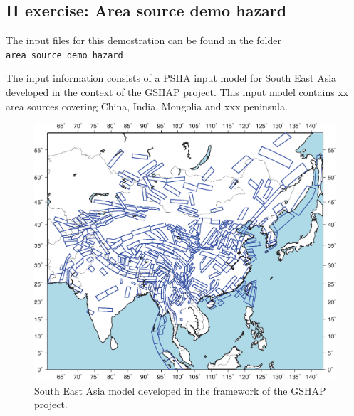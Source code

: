 \subsection{II exercise: Area source demo hazard}
%
The input files for this demostration can be found in the folder 
\texttt{area\_\-source\_\-demo\_\-hazard}

The input information consists of a PSHA input model for South East Asia 
developed in the context of the GSHAP project. This input model contains 
xx area sources covering China, India, Mongolia and xxx peninsula.

\begin{figure}[!ht]
\centering
\includegraphics[width=\textwidth,angle=0]{./figures/seAsiaGSHAP.eps}
\caption{South East Asia model developed in the framework of the GSHAP 
project.}
\label{fig:sea_psha_gshap}
\end{figure}


\cleardoublepage
